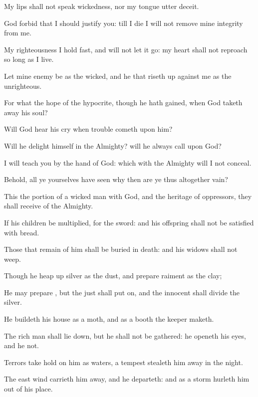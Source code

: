{My
lips shall not
speak
wickedness, nor my
tongue
utter
deceit.

God
forbid that I should
justify you: till I
die I will not
remove mine
integrity from me.

My
righteousness I
hold fast, and will not let it
go: my
heart shall not
reproach
{} so long as I
live.


\par }{\PP {}Let mine
enemy be as the
wicked, and he that riseth
up against me as the
unrighteous.

For what
{} the
hope of the
hypocrite, though he hath
gained, when
God taketh
away his
soul?

Will
God
hear his
cry when
trouble
cometh upon him?

Will he
delight himself in the
Almighty? will he
always
call upon
God?


\par }{\PP {}I will
teach you by the
hand of
God:
{} which
{} with the
Almighty will I not
conceal.

Behold, all ye yourselves have
seen
{} why then are ye thus
altogether
vain?

This
{} the
portion of a
wicked
man with
God, and the
heritage of
oppressors,
{} they shall
receive of the
Almighty.

If his
children be
multiplied,
{}
for the
sword: and his
offspring shall not be
satisfied with
bread.

Those that
remain of him shall be
buried in
death: and his
widows shall not
weep.

Though he heap
up
silver as the
dust, and
prepare
raiment as the
clay;

He may
prepare
{}, but the
just shall put
{}
on, and the
innocent shall
divide the
silver.

He
buildeth his
house as a
moth, and as a
booth
{} the
keeper
maketh.

The
rich man shall lie
down, but he shall not be
gathered: he
openeth his
eyes, and he
{} not.

Terrors take
hold on him as
waters, a
tempest stealeth him
away in the
night.

The
east wind carrieth him
away, and he
departeth: and as a storm
hurleth him out of his
place.

}
